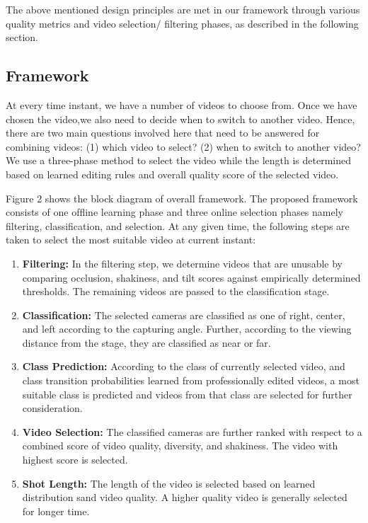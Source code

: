 \documentclass{sig-alternate}
\begin{document}
The above mentioned design principles are met in our framework through various quality metrics and video selection/ ﬁltering phases, as described in the following section.

\subsection{Framework}
At every time instant, we have a number of videos to choose from. Once we have chosen the video,we also need to decide when to switch to another video. Hence, there are two main questions involved here that need to be answered for combining videos: (1) which video to select? (2) when to switch to another video? We use a three-phase method to select the video while the length is determined based on learned editing rules and overall quality score of the selected video. 

Figure 2 shows the block diagram of overall framework. The proposed framework consists of one ofﬂine learning phase and three online selection phases namely ﬁltering, classiﬁcation, and selection. At any given time, the following steps are taken to select the most suitable video at current instant:

\begin{enumerate}
\item  \textbf{Filtering:} In the ﬁltering step, we determine videos that are unusable by comparing occlusion, shakiness, and tilt scores against empirically determined thresholds. The remaining videos are passed to the classiﬁcation stage.
\item \textbf{Classiﬁcation:} The selected cameras are classiﬁed as one of right, center, and left according to the capturing angle. Further, according to the viewing distance from the stage, they are classiﬁed as near or far.
\item \textbf{Class Prediction:} According to the class of currently selected video, and class transition probabilities learned from professionally edited videos, a most suitable class is predicted and videos from that class are selected for further consideration.
\item \textbf{Video Selection:} The classiﬁed cameras are further ranked with respect to a combined score of video quality, diversity, and shakiness. The video with highest score is selected.
\item \textbf{Shot Length:} The length of the video is selected based on learned distribution sand video quality. A higher quality video is generally selected for longer time.
\end{enumerate}
\end{document}
